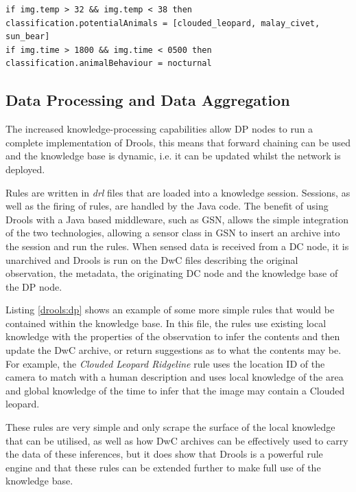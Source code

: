 	\begin{lstlisting}[caption=Encoded Data Collection Rule, label=lst:dcrule, breaklines=true]
if img.temp > 32 && img.temp < 38 then
classification.potentialAnimals = [clouded_leopard, malay_civet, sun_bear]
if img.time > 1800 && img.time < 0500 then
classification.animalBehaviour = nocturnal
	\end{lstlisting}
	
	\subsection{Data Processing and Data Aggregation}
		The increased knowledge-processing capabilities allow DP nodes to run a complete implementation of Drools, this means that forward chaining can be used and the knowledge base is dynamic, i.e. it can be updated whilst the network is deployed. 
		
		Rules are written in \textit{drl} files that are loaded into a knowledge session. Sessions, as well as the firing of rules, are handled by the Java code. The benefit of using Drools with a Java based middleware, such as GSN, allows the simple integration of the two technologies, allowing a sensor class in GSN to insert an archive into the session and run the rules. When sensed data is received from a DC node, it is unarchived and Drools is run on the DwC files describing the original observation, the metadata, the originating DC node and the knowledge base of the DP node.
		
		Listing \ref{drools:dp} shows an example of some more simple rules that would be contained within the knowledge base. In this file, the rules use existing local knowledge with the properties of the observation to infer the contents and then update the DwC archive, or return suggestions as to what the contents may be. For example, the \textit{Clouded Leopard Ridgeline} rule uses the location ID of the camera to match with a human description and uses local knowledge of the area and global knowledge of the time to infer that the image may contain a Clouded leopard.
		
		
		
		These rules are very simple and only scrape the surface of the local knowledge that can be utilised, as well as how DwC archives can be effectively used to carry the data of these inferences, but it does show that Drools is a powerful rule engine and that these rules can be extended further to make full use of the knowledge base. 
		
